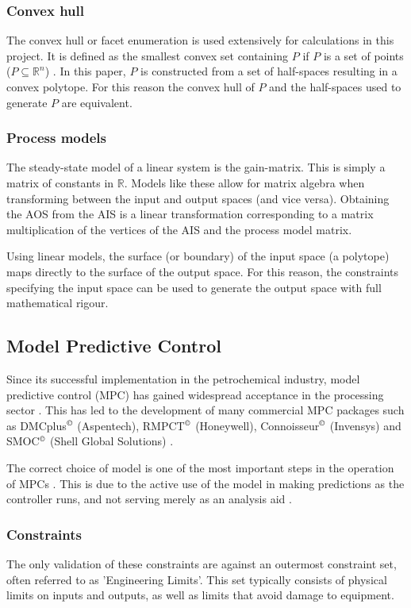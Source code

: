 \documentclass[final,authoryear,5pt,times,twocolumn]{elsarticle}
\begin{document}
\subsubsection{Convex hull}
The convex hull or facet enumeration is used extensively for calculations in this project.
It is defined as the smallest convex set containing $P$ if $P$ is a set of points ($P \subseteq \mathbb{R}^n$) \citep[74]{wenger}.
In this paper, $P$ is constructed from a set of half-spaces resulting in a convex polytope.
For this reason the convex hull of $P$ and the half-spaces used to generate $P$ are equivalent.

\subsubsection{Process models}
The steady-state model of a linear system is the gain-matrix.
This is simply a matrix of constants in $\mathbb{R}$.
Models like these allow for matrix algebra when transforming between the input and output spaces (and vice versa).
Obtaining the AOS from the AIS is a linear transformation \citep[48-49,~166]{leung} corresponding to a matrix multiplication of the vertices of the AIS and the process model matrix.

Using linear models, the surface (or boundary) of the input space (a polytope) maps directly to the surface of the output space.
For this reason, the constraints specifying the input space can be used to generate the output space with full mathematical rigour.


\subsection{Model Predictive Control}
Since its successful implementation in the petrochemical industry, model predictive control (MPC) has gained widespread acceptance in the processing sector \citep[1]{maciejowskimpc}. 
This has led to the development of many commercial MPC packages such as DMCplus$^{\copyright}$ (Aspentech), RMPCT$^{\copyright}$ (Honeywell), Connoisseur$^{\copyright}$ (Invensys) and SMOC$^{\copyright}$ (Shell Global Solutions) \citep{qinbadgwell}.

The correct choice of model is one of the most important steps in the operation of MPCs \citep[17]{rossiter}.
This is due to the active use of the model in making predictions as the controller runs, and not serving merely as an analysis aid \citep[37]{maciejowskimpc}.

\subsubsection{Constraints}\label{sec:mpccons}
The only validation of these constraints are against an outermost constraint set, often referred to as 'Engineering Limits'.
This set typically consists of physical limits on inputs and outputs, as well as limits that avoid damage to equipment.
\end{document}
